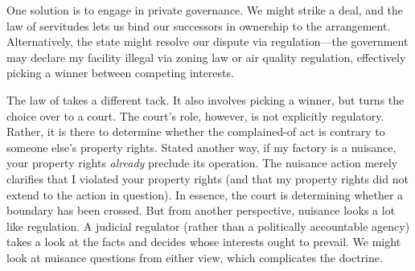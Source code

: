 One solution is to engage in private governance. We might strike a deal, and the
law of servitudes lets us bind our successors in ownership to the arrangement.
Alternatively, the state might resolve our dispute via regulation---the
government may declare my facility illegal via zoning law or air quality
regulation, effectively picking a winner between competing interests. 

The law of  takes a different tack. It also involves picking a
winner,
but turns the choice over to a court. The court's role, however, is not
explicitly regulatory. Rather, it is there to determine whether the
complained-of act is contrary to someone else's property rights. Stated another
way, if my factory is a nuisance, your property rights \textit{already} preclude
its operation. The nuisance action merely clarifies that I violated your
property rights (and that my property rights did not extend to the action in
question). In essence, the court is determining whether a boundary has been
crossed. But from another perspective, nuisance looks a lot like regulation. A
judicial regulator (rather than a politically accountable agency) takes a look
at the facts and decides whose interests ought to prevail. We might look at
nuisance questions from either view, which complicates the doctrine.

